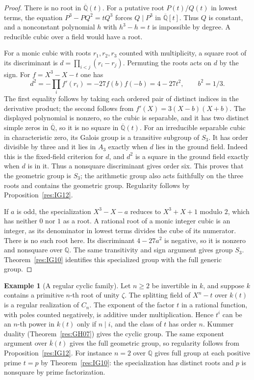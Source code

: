 \documentclass[11pt,oneside,openany]{book}
\theoremstyle{definition}
\newtheorem{example}[theorem]{Example}
\theoremstyle{remark}
\begin{document}
\begin{proof}
There is no root in \(\overline{\mathbb Q}(t)\).
For a putative root \(P(t)/Q(t)\) in lowest terms, the equation
\(P^3-PQ^2=tQ^3\) forces \(Q\mid P^3\) in
\(\overline{\mathbb Q}[t]\). Thus \(Q\) is constant, and
a nonconstant polynomial \(h\) with \(h^3-h=t\) is impossible
by degree. A reducible cubic over a field would have a root.

For a monic cubic with roots \(r_1,r_2,r_3\) counted with multiplicity,
a square root of its discriminant is
\(d=\prod_{i<j}(r_i-r_j)\). Permuting the roots acts on \(d\)
by the sign. For \(f=X^3-X-t\) one has
\[
 d^2=-\prod_i f'(r_i)
     =-27f(b)f(-b)=4-27t^2,\qquad b^2=1/3 .
\]
The first equality follows by taking each ordered pair of
distinct indices in the derivative product; the second follows
from \(f'(X)=3(X-b)(X+b)\). The displayed polynomial is
nonzero, so the cubic is separable, and it has two distinct
simple zeros in \(\overline{\mathbb Q}\), so it is no square
in \(\overline{\mathbb Q}(t)\). For an irreducible separable
cubic in characteristic zero, its Galois group is a transitive
subgroup of \(S_3\). It has order divisible by three and it
lies in \(A_3\) exactly when \(d\) lies in the ground field.
Indeed this is the fixed-field criterion for \(d\), and
\(d^2\) is a square in the ground field exactly when \(d\) is
in it. Thus a nonsquare discriminant gives order six.
This proves that the geometric group is \(S_3\); the arithmetic
group also acts faithfully on the three roots and contains the
geometric group. Regularity follows by Proposition~\ref{res:IG12}.

If \(a\) is odd, the specialization \(X^3-X-a\) reduces to
\(X^3+X+1\) modulo \(2\), which has neither \(0\) nor \(1\)
as a root. A rational root of a monic integer cubic is an
integer, as its denominator in lowest terms divides the cube
of its numerator. There is no such root here. Its discriminant
\(4-27a^2\) is negative, so it is nonzero and nonsquare over
\(\mathbb Q\). The same transitivity and sign argument gives
group \(S_3\). Theorem~\ref{res:IG10} identifies this specialized
group with the full generic group.
\end{proof}

\begin{example}[A regular cyclic family]
\label{res:IG14}
Let \(n\geq2\) be invertible in \(k\), and suppose \(k\) contains a
primitive \(n\)-th root of unity \(\zeta\). The
splitting field of \(X^n-t\) over \(k(t)\) is a regular realization
of \(C_n\). The exponent of the factor \(t\) in a rational
function, with poles counted negatively, is additive under
multiplication. Hence \(t^i\) can be an \(n\)-th power in \(k(t)\)
only if \(n\mid i\), and the class of \(t\) has order \(n\).
Kummer duality (Theorem~\ref{res:GH07}) gives the cyclic group.
The same exponent argument over \(\overline k(t)\) gives the
full geometric group, so regularity follows from
Proposition~\ref{res:IG12}. For instance \(n=2\) over
\(\mathbb Q\) gives full group at each positive prime \(t=p\)
by Theorem~\ref{res:IG10}: the specialization has distinct roots
and \(p\) is nonsquare by prime factorization.
\end{example}
\end{document}
